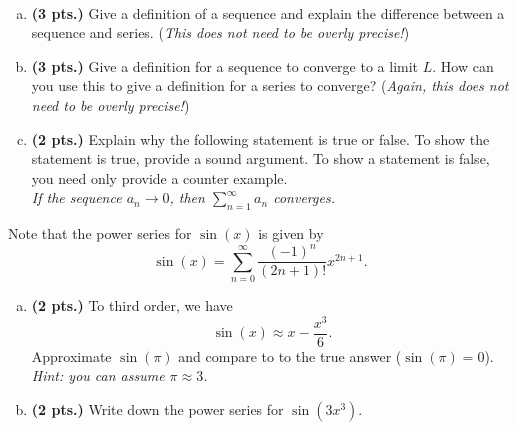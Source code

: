 \documentclass[12pt]{amsbook}
\begin{document}
\vspace*{0.5cm}



\begin{problem} ~
\begin{enumerate}[(a)]
\item \textbf{(3 pts.)} Give a definition of a sequence and explain the difference between a sequence and series. (\emph{This does not need to be overly precise!})

\item \textbf{(3 pts.)} Give a definition for a sequence to converge to a limit $L$. How can you use this to give a definition for a series to converge? (\emph{Again, this does not need to be overly precise!})

    \item \textbf{(2 pts.)} Explain why the following statement is true or false. To show the statement is true, provide a sound argument. To show a statement is false, you need only provide a counter example.\\

\emph{If the sequence $a_n \to 0$, then $\displaystyle{\sum_{n=1}^\infty a_n}$ converges.}

\end{enumerate}
\end{problem}

\begin{problem}
Note that the power series for $\sin(x)$ is given by
\[
\sin(x) = \sum_{n=0}^\infty \frac{(-1)^{n}}{(2n+1)!}x^{2n+1}.
\]
\begin{enumerate}[(a)]
\item \textbf{(2 pts.)} To third order, we have
\[
\sin(x) \approx x -\frac{x^3}{6}.
\]
Approximate $\sin(\pi)$ and compare to to the true answer ($\sin(\pi)=0$). \emph{Hint: you can assume $\pi \approx 3$.}
\item \textbf{(2 pts.)} Write down the power series for $\sin(3x^3)$.
\end{enumerate}
\end{problem}

\vspace*{0.5cm}
\end{document}
